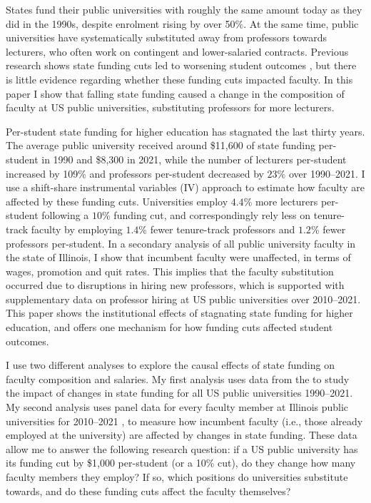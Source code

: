States fund their public universities with roughly the same amount today as they did in the 1990s, despite enrolment rising by over 50\%.
At the same time, public universities have systematically substituted away from professors towards lecturers, who often work on contingent and lower-salaried contracts.
Previous research shows state funding cuts led to worsening student outcomes \citep{NBERw23736,NBERw27885}, but there is little evidence regarding whether these funding cuts impacted faculty.
In this paper I show that falling state funding caused a change in the composition of faculty at US public universities, substituting professors for more lecturers.

Per-student state funding for higher education has stagnated the last thirty years.
The average public university received around \$11,600 of state funding per-student in 1990 and \$8,300 in 2021, while the number of lecturers per-student increased by 109\% and professors per-student decreased by $23$\% over 1990--2021.
I use a shift-share instrumental variables (IV) approach to estimate how faculty are affected by these funding cuts.
Universities employ $4.4$\% more lecturers per-student following a $10$\% funding cut, and correspondingly rely less on tenure-track faculty by employing $1.4$\% fewer tenure-track professors and $1.2$\% fewer professors per-student.
In a secondary analysis of all public university faculty in the state of Illinois, I show that incumbent faculty were unaffected, in terms of wages, promotion and quit rates.
This implies that the faculty substitution occurred due to disruptions in hiring new professors, which is supported with supplementary data on professor hiring at US public universities over 2010--2021.
This paper shows the institutional effects of stagnating state funding for higher education, and offers one mechanism for how funding cuts affected student outcomes.

I use two different analyses to explore the causal effects of state funding on faculty composition and salaries.
My first analysis uses data from the \citet[IPEDS]{ipeds} to study the impact of changes in state funding for all US public universities 1990--2021.
My second analysis uses panel data for every faculty member at Illinois public universities for 2010--2021 \citet[IBHED]{ibhed}, to measure how incumbent faculty (i.e., those already employed at the university) are affected by changes in state funding.
These data allow me to answer the following research question: if a US public university has its funding cut by \$1,000 per-student (or a 10\% cut), do they change how many faculty members they employ?
If so, which positions do universities substitute towards, and do these funding cuts affect the faculty themselves?

